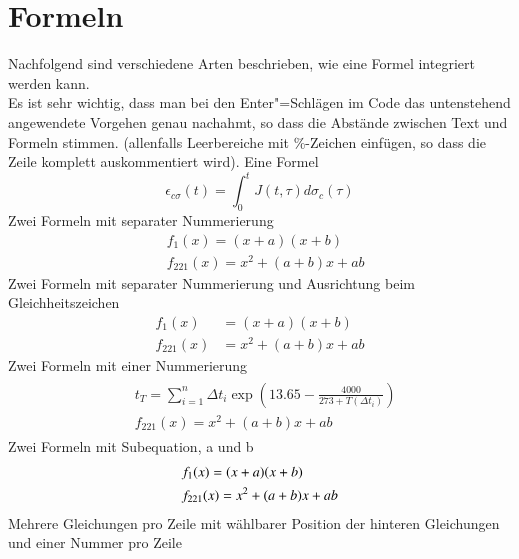 \section{Formeln}%
%
Nachfolgend sind verschiedene Arten beschrieben, wie eine Formel integriert werden kann.\\
Es ist sehr wichtig, dass man bei den Enter"=Schlägen im Code das untenstehend angewendete Vorgehen genau nachahmt, so dass die Abstände zwischen Text und Formeln stimmen. (allenfalls Leerbereiche mit \%-Zeichen einfügen, so dass die Zeile komplett auskommentiert wird).%
%
Eine Formel%
%
\begin{equation}
     \epsilon_{c\sigma}(t)=\int_0^t J(t,\tau) d\sigma_c(\tau) \label{Formellabel1}
\end{equation}
%
%
Zwei Formeln mit separater Nummerierung%
%
\begin{align}
 &f_1(x) = (x+a)(x+b) \label{Formellabel2} \\
 &f_{221}(x)= x^2 + (a+b)x + ab \label{Formellabel3}
\end{align}
%
Zwei Formeln mit separater Nummerierung und Ausrichtung beim Gleichheitszeichen%
%
\begin{align}
 f_1(x) &= (x+a)(x+b) \label{Formellabel4} \\
 f_{221}(x)&= x^2 + (a+b)x + ab \label{Formellabel5}
\end{align}
%
Zwei Formeln mit einer Nummerierung%
%
\begin{equation}
\begin{gathered}
\begin{split}
 &t_T = \sum\limits^{n}_{i=1} \Delta t_i \exp{\left(13.65-\frac{4000}{273+ T(\Delta t_i )}\right)} \\
 &f_{221}(x)= x^2 + (a+b)x + ab 
\end{split}
\end{gathered}
\label{Formellabel6}
\end{equation}
%
Zwei Formeln mit Subequation, a und b%
%
\begin{subequations} 
\begin{align} 
\renewcommand\theequation{\theparentequation.\alph{equation}} 
&f_1(x) = (x+a)(x+b)  \label{Formellabel8}\\
&f_{221}(x)= x^2 + (a+b)x + ab \label{Formellabel9}
\end{align}
\end{subequations} 
%
Mehrere Gleichungen pro Zeile mit wählbarer Position der hinteren Gleichungen und einer Nummer pro Zeile%
